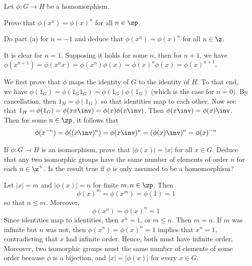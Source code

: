 \begin{problems}
    \item Let $\phi : G \to H$ be a homomorphism.
    \begin{problems}
        \item Prove that $\phi(x^n) = \phi(x)^n$ for all $n \in \zp$.
        \item Do part (a) for $n = - 1$ and deduce that $\phi(x^n) = \phi(x)^n$ for all $n \in \z$.
    \end{problems}
    \begin{solalph}
        \item It is clear for $n = 1$. Supposing it holds for some $n$, then for $n + 1$, we have $\phi(x^{n + 1}) = \phi(x^nx) = \phi(x^n)\phi(x) = \phi(x)^n\phi(x) = \phi(x)^{n + 1}$.
        \item We first prove that $\phi$ maps the identity of $G$ to the identity of $H$. To that end, we have $\phi(1_G) = \phi(1_G1_G) = \phi(1_G)\phi(1_G)$ (which is the case for $n = 0$). By cancellation, then $1_H = \phi(1_G)$ so that identities map to each other. Now see that $1_H = \phi(1_G) = \phi(xx\inv) = \phi(x)\phi(x\inv)$. Then $\phi(x\inv) = \phi(x)\inv$. Then for some $n \in \zp$, it follows that
        \[\phi(x^{-n}) = \phi((x\inv)^n) = \phi(x\inv)^n = (\phi(x)\inv)^n = \phi(x)^{-n}\]
    \end{solalph}
    \item If $\phi : G \to H$ is an isomorphism, prove that $|\phi(x)| = |x|$ for all $x \in G$. Deduce that any two isomorphic groups have the same number of elements of order $n$ for each $n \in \z^+$. Is the result true if $\phi$ is only assumed to be a homomorphism?
    \begin{sol}
        Let $|x| = m$ and $|\phi(x)| = n$ for finite $m, n \in \zp$. Then
        \[\phi(x)^m = \phi(x^m) = \phi(1) = 1\]
        so that $n \leq m$. Moreover,
        \[\phi(x^n) = \phi(x)^n = 1\]
        Since identities map to identities, then $x^n = 1$, or $m \leq n$. Then $m = n$. If $m$ was infinite but $n$ was not, then $\phi(x^n) = \phi(x)^n = 1$ implies that $x^n = 1$, contradicting that $x$ had infinite order. Hence, both must have infinite order. Moreover, two isomorphic groups must the same number of elements of some order because $\phi$ is a bijection, and $|x| = |\phi(x)|$ for every $x \in G$.
        

\end{sol}
\end{problems}
